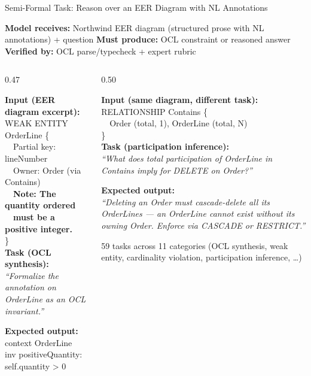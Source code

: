 \documentclass[aspectratio=169]{beamer}
\begin{document}
\begin{frame}{Semi-Formal Task: Reason over an EER Diagram with NL Annotations}

{\small
\textbf{Model receives:} Northwind EER diagram (structured prose with NL annotations) + question \quad
\textbf{Must produce:} OCL constraint or reasoned answer \quad
\textbf{Verified by:} OCL parse/typecheck + expert rubric}

\vspace{0.3em}
\begin{columns}[T]
\begin{column}{0.47\textwidth}
\colorbox{semiformal!10}{\parbox{0.95\linewidth}{\footnotesize
\textbf{Input (EER diagram excerpt):}\\[0.2em]
{\scriptsize\ttfamily
WEAK ENTITY OrderLine \{\\
~~Partial key: lineNumber\\
~~Owner: Order (via Contains)\\
~~\textbf{Note: The quantity ordered}\\
~~\textbf{must be a positive integer.}\\
\}}\\[0.4em]
\textbf{Task (OCL synthesis):}\\[0.2em]
\textit{``Formalize the annotation on OrderLine as an OCL invariant.''}
}}

\vspace{0.2em}
\colorbox{semiformal!10}{\parbox{0.95\linewidth}{\footnotesize
\textbf{Expected output:}\\[0.2em]
{\scriptsize\ttfamily
context OrderLine\\
inv positiveQuantity: self.quantity > 0
}}}
\end{column}

\begin{column}{0.50\textwidth}
\colorbox{semiformal!10}{\parbox{0.95\linewidth}{\footnotesize
\textbf{Input (same diagram, different task):}\\[0.2em]
{\scriptsize\ttfamily
RELATIONSHIP Contains \{\\
~~Order (total, 1), OrderLine (total, N)\\
\}}\\[0.4em]
\textbf{Task (participation inference):}\\[0.2em]
\textit{``What does total participation of OrderLine in Contains imply for DELETE on Order?''}
}}

\vspace{0.2em}
\colorbox{semiformal!10}{\parbox{0.95\linewidth}{\footnotesize
\textbf{Expected output:}\\[0.2em]
\textit{``Deleting an Order must cascade-delete all its OrderLines --- an OrderLine cannot exist without its owning Order. Enforce via CASCADE or RESTRICT.''}
}}

\vspace{0.3em}
{\footnotesize 59 tasks across 11 categories (OCL synthesis, weak entity, cardinality violation, participation inference, \ldots)}
\end{column}
\end{columns}

\end{frame}
\end{document}

